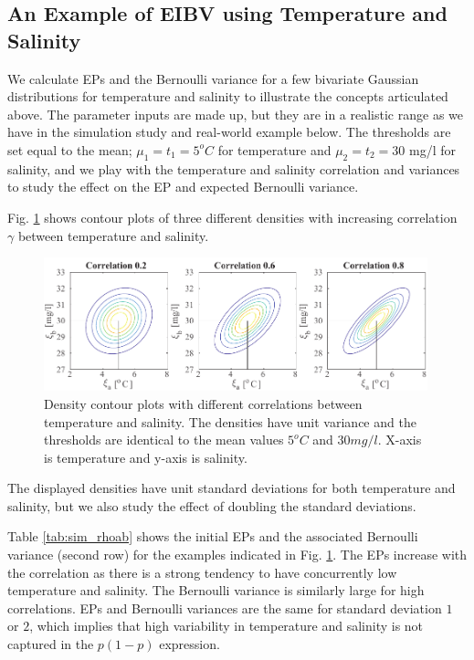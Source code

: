 \documentclass[aoas]{imsart}
\begin{document}
\subsection{An Example of EIBV using Temperature and Salinity}
\label{Sec:UnivarEx}

We calculate EPs and the Bernoulli variance for a few bivariate
Gaussian distributions for temperature and salinity to illustrate the concepts articulated above. The parameter inputs are made up, but they are in a realistic range as we have in the simulation study and real-world example below. The thresholds are set equal to the mean; $\mu_1=t_1=5^o C$ for temperature and  $\mu_2=t_2=30$ mg/l for salinity, and we play with the temperature and salinity correlation and variances to study the effect on the EP and expected Bernoulli variance. 

Fig. \ref{illus_bivarDens} shows contour plots of three different
densities with increasing correlation $\gamma$ between temperature and
salinity. 
\begin{figure}[h!] \centering
  \includegraphics[width=0.99\textwidth]{Figures/illus_bivar.pdf}
  \caption{Density contour plots with different correlations between
    temperature and salinity. The densities have unit variance and the
    thresholds are identical to the mean values $5^o C$ and
    $30 mg/l$. X-axis is temperature and y-axis is salinity.}
\label{illus_bivarDens}
\end{figure}
The displayed densities have unit standard deviations for both
temperature and salinity, but we also study the effect of doubling the
standard deviations.

Table \ref{tab:sim_rhoab} shows the initial EPs and the associated
Bernoulli variance (second row) for the examples indicated in Fig.
\ref{illus_bivarDens}. The EPs increase with the correlation as there
is a strong tendency to have concurrently low temperature and salinity. The Bernoulli variance is similarly large for high
correlations. EPs and Bernoulli variances are the same for standard
deviation $1$ or $2$, which implies that high variability in
temperature and salinity is not captured in the $p(1-p)$ expression.
\end{document}
